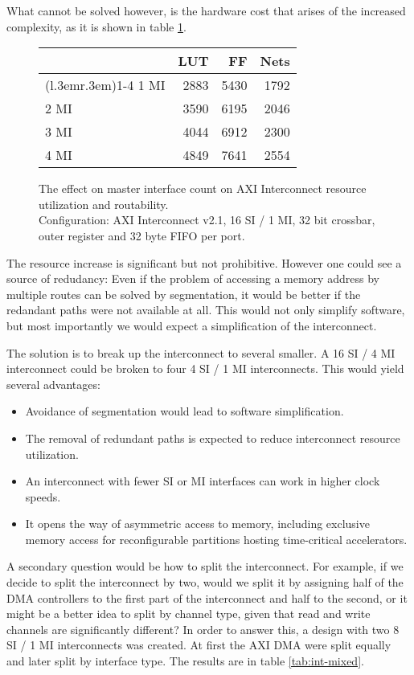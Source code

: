 What cannot be solved however, is the hardware cost that arises of the increased
complexity, as it is shown in table \ref{tab:int-mmi}.

\begin{figure}[ht!]
\centering
\begin{tabular}{lrrr}
\toprule
	& LUT	& FF	& Nets \\
\cmidrule(l{.3em}r{.3em}){1-4}
1 MI	& 2883	& 5430	& 1792	\\
2 MI	& 3590	& 6195	& 2046	\\
3 MI	& 4044	& 6912	& 2300	\\
4 MI	& 4849	& 7641	& 2554	\\
\bottomrule
\end{tabular}
\caption{The effect on master interface count on AXI Interconnect resource utilization and routability.\\
	Configuration: AXI Interconnect v2.1, 16 SI / 1 MI, 32 bit crossbar, 
	outer register and 32 byte FIFO per port.}
\label{tab:int-mmi}
\end{figure}

The resource increase is significant but not prohibitive. 
However one could see a source of redudancy: Even if the problem
of accessing a memory address by multiple routes can be solved by segmentation,
it would be better if the redandant paths were not available at all.
This would not only simplify software, but most importantly we would expect
a simplification of the interconnect.

The solution is to break up the interconnect to several smaller. 
A 16 SI / 4 MI interconnect could be
broken to four 4 SI / 1 MI interconnects. 
This would yield several advantages:
\begin{itemize}
\item	Avoidance of segmentation would lead to software simplification.
\item	The removal of redundant paths is expected to reduce interconnect resource utilization.
\item	An interconnect with fewer SI or MI interfaces can work in higher clock speeds.
\item	It opens the way of asymmetric access to memory, including exclusive memory access
	for reconfigurable partitions hosting time-critical accelerators.
\end{itemize}
 
A secondary question would be how to split the interconnect. 
For example, if we decide to split the interconnect by two, 
would we split it by assigning half of the DMA controllers to the first
part of the interconnect and half to the second, or it might be a better idea to split by
channel type, given that read and write channels are significantly different? 
In order to answer this, a design with two 8 SI / 1 MI interconnects was created.
At first the AXI DMA were split equally and later split by interface type.
The results are in table \ref{tab:int-mixed}.

